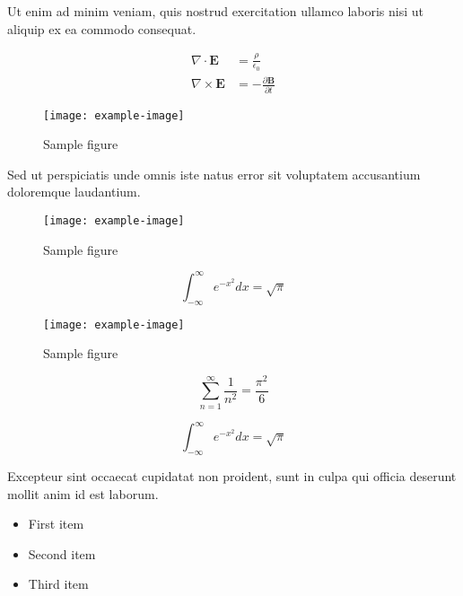 \documentclass{article}
\begin{document}
Ut enim ad minim veniam, quis nostrud exercitation ullamco laboris nisi ut aliquip ex ea commodo consequat.


\begin{align}
    \nabla \cdot \mathbf{E} &= \frac{\rho}{\epsilon_0} \\
    \nabla \times \mathbf{E} &= -\frac{\partial \mathbf{B}}{\partial t}
\end{align}

\begin{figure}[h]
    \centering
    \texttt{[image: example-image]}
    \caption{Sample figure}
    \label{fig:sample}
\end{figure}

Sed ut perspiciatis unde omnis iste natus error sit voluptatem accusantium doloremque laudantium.

\begin{figure}[h]
    \centering
    \texttt{[image: example-image]}
    \caption{Sample figure}
    \label{fig:sample}
\end{figure}

\begin{equation}
    \int_{-\infty}^{\infty} e^{-x^2} dx = \sqrt{\pi}
\end{equation}


\begin{figure}[h]
    \centering
    \texttt{[image: example-image]}
    \caption{Sample figure}
    \label{fig:sample}
\end{figure}


\begin{equation}
    \sum_{n=1}^{\infty} \frac{1}{n^2} = \frac{\pi^2}{6}
\end{equation}

\begin{equation}
    \int_{-\infty}^{\infty} e^{-x^2} dx = \sqrt{\pi}
\end{equation}

Excepteur sint occaecat cupidatat non proident, sunt in culpa qui officia deserunt mollit anim id est laborum.

\begin{itemize}
\item First item
\item Second item
\item Third item
\end{itemize}
\end{document}
